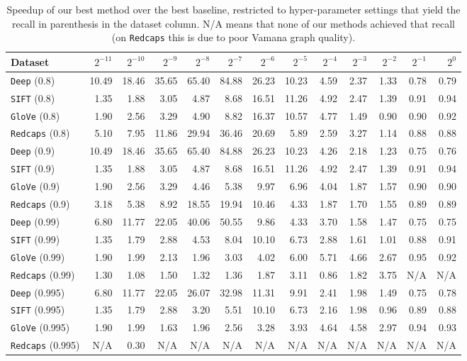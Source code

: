 \documentclass{article}
\theoremstyle{plain}
\theoremstyle{definition}
\theoremstyle{remark}
\newcommand{\datasetname}[1]{\texttt{#1}}
\begin{document}
\begin{table}
\centering
\caption{Speedup of our best method over the best baseline, restricted to hyper-parameter settings that yield the recall in parenthesis in the dataset column. N/A means that none of our methods achieved that recall (on \datasetname{Redcaps} this is due to poor Vamana graph quality).}
\begin{tabular}{|l|rrrrrrrrrrrr|}
\toprule
Dataset & $2^{-11}$ & $2^{-10}$ & $2^{-9}$ & $2^{-8}$ & $2^{-7}$ & $2^{-6}$ & $2^{-5}$ & $2^{-4}$ & $2^{-3}$ & $2^{-2}$ & $2^{-1}$ & $2^{0}$ \\
\hline
\datasetname{Deep} (0.8) & 10.49 & 18.46 & 35.65 & 65.40 & 84.88 & 26.23 & 10.23 & 4.59 & 2.37 & 1.33 & 0.78 & 0.79 \\
\datasetname{SIFT} (0.8) & 1.35 & 1.88 & 3.05 & 4.87 & 8.68 & 16.51 & 11.26 & 4.92 & 2.47 & 1.39 & 0.91 & 0.94 \\
\datasetname{GloVe} (0.8) & 1.90 & 2.56 & 3.29 & 4.90 & 8.82 & 16.37 & 10.57 & 4.77 & 1.49 & 0.90 & 0.90 & 0.92 \\
\datasetname{Redcaps} (0.8) & 5.10 & 7.95 & 11.86 & 29.94 & 36.46 & 20.69 & 5.89 & 2.59 & 3.27 & 1.14 & 0.88 & 0.88 \\
\hline
\datasetname{Deep} (0.9) & 10.49 & 18.46 & 35.65 & 65.40 & 84.88 & 26.23 & 10.23 & 4.26 & 2.18 & 1.23 & 0.75 & 0.76 \\
\datasetname{SIFT} (0.9) & 1.35 & 1.88 & 3.05 & 4.87 & 8.68 & 16.51 & 11.26 & 4.92 & 2.47 & 1.39 & 0.91 & 0.94 \\
\datasetname{GloVe} (0.9) & 1.90 & 2.56 & 3.29 & 4.46 & 5.38 & 9.97 & 6.96 & 4.04 & 1.87 & 1.57 & 0.90 & 0.90 \\
\datasetname{Redcaps} (0.9) & 3.18 & 5.38 & 8.92 & 18.55 & 19.94 & 10.46 & 4.33 & 1.87 & 1.70 & 1.55 & 0.89 & 0.89 \\
\hline
\datasetname{Deep} (0.99) & 6.80 & 11.77 & 22.05 & 40.06 & 50.55 & 9.86 & 4.33 & 3.70 & 1.58 & 1.47 & 0.75 & 0.75 \\
\datasetname{SIFT} (0.99) & 1.35 & 1.79 & 2.88 & 4.53 & 8.04 & 10.10 & 6.73 & 2.88 & 1.61 & 1.01 & 0.88 & 0.91 \\
\datasetname{GloVe} (0.99) & 1.90 & 1.99 & 2.13 & 1.96 & 3.03 & 4.02 & 6.00 & 5.71 & 4.66 & 2.67 & 0.95 & 0.92 \\
\datasetname{Redcaps} (0.99) & 1.30 & 1.08 & 1.50 & 1.32 & 1.36 & 1.87 & 3.11 & 0.86 & 1.82 & 3.75 & N/A & N/A \\
\hline
\datasetname{Deep} (0.995) & 6.80 & 11.77 & 22.05 & 26.07 & 32.98 & 11.31 & 9.91 & 2.41 & 1.98 & 1.49 & 0.75 & 0.78 \\
\datasetname{SIFT} (0.995)  & 1.35 & 1.79 & 2.88 & 3.20 & 5.51 & 10.10 & 6.73 & 2.16 & 1.98 & 0.96 & 0.89 & 0.88 \\
\datasetname{GloVe} (0.995)  & 1.90 & 1.99 & 1.63 & 1.96 & 2.56 & 3.28 & 3.93 & 4.64 & 4.58 & 2.97 & 0.94 & 0.93 \\
\datasetname{Redcaps} (0.995)  & N/A & 0.30 & N/A & N/A & N/A & N/A & N/A & N/A & N/A & N/A & N/A & N/A\\
\hline
\end{tabular}
\label{tab:all_speedups}
\end{table}
\end{document}
